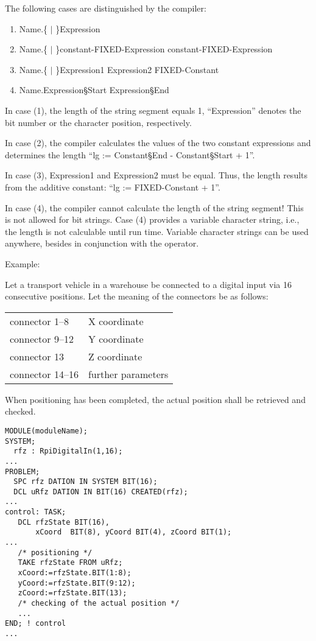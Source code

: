The following cases are distinguished by the compiler:
\begin{enumerate}
\item Name.\{  $\mid$  \}\kw{(}Expression\kw{)}
\item Name.\{  $\mid$  \}\kw{(}constant-FIXED-Expression\kw{:} constant-FIXED-Expression\kw{)}
\item Name.\{  $\mid$  \}\kw{(}Expression1\kw{:} Expression2 \kw{+} FIXED-Constant\kw{)}
\item Name.\kw{(}Expression\S Start\kw{:} Expression\S End\kw{)}
\end{enumerate}

In case (1), the length of the string segment equals 1, ``Expression''
denotes the bit number or the character position, respectively.

In case (2), the compiler calculates the values of the two constant
expressions and determines the length ``lg := Constant\S End -
Constant\S Start + 1''.

In case (3), Expression1 and Expression2 must be equal. Thus, the length
results from the additive constant: ``lg := FIXED-Constant + 1''.

In case (4), the compiler cannot calculate the length of the string
segment! This is not allowed for bit strings. Case (4) provides a
variable character string, i.e., the length is not calculable until run
time. Variable character strings can be used anywhere, besides in
conjunction with the   operator.

Example:

Let a transport vehicle in a warehouse be connected to a digital input
via 16 consecutive positions. Let the meaning of the connectors be as
follows:

\begin{tabular}{l@{ : }l}
connector 1--8   & X coordinate\\
connector 9--12  & Y coordinate\\
connector 13     & Z coordinate\\
connector 14--16 & further parameters
\end{tabular}

When positioning has been completed, the actual position shall be
retrieved and checked.

\begin{lstlisting}
MODULE(moduleName);
SYSTEM;
  rfz : RpiDigitalIn(1,16);
...
PROBLEM;
  SPC rfz DATION IN SYSTEM BIT(16);
  DCL uRfz DATION IN BIT(16) CREATED(rfz);
...
control: TASK;
   DCL rfzState BIT(16),
       xCoord  BIT(8), yCoord BIT(4), zCoord BIT(1);
...
   /* positioning */ 
   TAKE rfzState FROM uRfz;
   xCoord:=rfzState.BIT(1:8);
   yCoord:=rfzState.BIT(9:12);
   zCoord:=rfzState.BIT(13);
   /* checking of the actual position */ 
   ...
END; ! control
...
\end{lstlisting}


